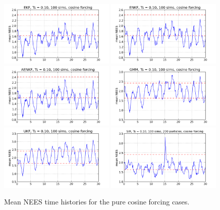\documentclass[]{article}
\begin{document}
\begin{figure}[p!]
\centering
\includegraphics[width=0.49\textwidth]{../../challenge_problem/trials/nees_ekf_sims_10_medium}
\includegraphics[width=0.49\textwidth]{../../challenge_problem/trials/nees_enkf_sims_10_medium}
\includegraphics[width=0.49\textwidth]{../../challenge_problem/trials/nees_aenkf_sims_10_medium}
\includegraphics[width=0.49\textwidth]{../../challenge_problem/trials/nees_gmm_sims_10_medium}
\includegraphics[width=0.49\textwidth]{../../challenge_problem/trials/nees_ukf_sims_10_medium}
\includegraphics[width=0.49\textwidth]{../../challenge_problem/trials/nees_sir_200_sims_10_medium}
\caption{Mean NEES time histories for the pure cosine forcing cases.}
\label{fig:nees_10_medium}
\end{figure}
\end{document}
